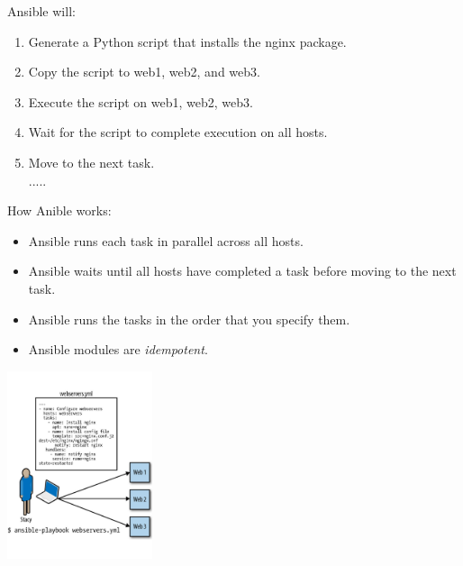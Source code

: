 \documentclass[pdf, 8pt, unicode, t]{beamer} %
\begin{document}
\begin{frame}
\hspace{2em}\alert{Ansible will:}

\begin{enumerate}
\addtolength{\itemindent}{1em}
\item Generate a Python script that installs the nginx package.
\item Copy the script to web1, web2, and web3.
\item Execute the script on web1, web2, web3.
\item Wait for the script to complete execution on all hosts.
\item Move to the next task.\\
.....
\end{enumerate}

\hspace{2em}\alert{How Anible works:}

\begin{itemize}
\item Ansible runs each task in parallel across all hosts.
\item Ansible waits until all hosts have completed a task before moving to the next task.
\item Ansible runs the tasks in the order that you specify them.
\item Ansible modules are {\it idempotent}.
\end{itemize}
\begin{center}
\vspace{-1.2em}
{\includegraphics[width=0.32\textwidth]{./images/scheme.pdf}}
\end{center}

\end{frame}
\end{document}
